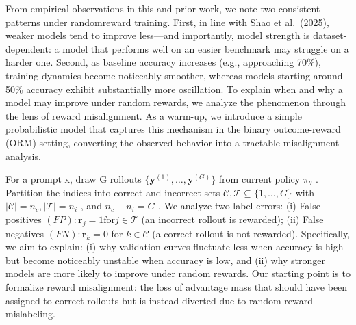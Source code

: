 \documentclass[
  10
]{article}
\begin{document}
From empirical observations in this and prior work, we note two
consistent patterns under randomreward training. First, in line with
Shao et al.~(2025), weaker models tend to improve less---and
importantly, model strength is dataset-dependent: a model that performs
well on an easier benchmark may struggle on a harder one. Second, as
baseline accuracy increases (e.g., approaching 70\%), training dynamics
become noticeably smoother, whereas models starting around 50\% accuracy
exhibit substantially more oscillation. To explain when and why a model
may improve under random rewards, we analyze the phenomenon through the
lens of reward misalignment. As a warm-up, we introduce a simple
probabilistic model that captures this mechanism in the binary
outcome-reward (ORM) setting, converting the observed behavior into a
tractable misalignment analysis.

For a prompt x, draw G rollouts
\(\{ \mathbf { y } ^ { ( 1 ) } , \ldots , \mathbf { y } ^ { ( G ) } \}\)
from current policy \(\pi _ { \theta }\) . Partition the indices into
correct and incorrect sets
\({ \mathcal { C } } , { \mathcal { T } } \subseteq \{ 1 , \ldots , G \}\)
with
\(| { \mathcal { C } } | = n _ { c } , | { \mathcal { T } } | = n _ { i }\)
, and \(n _ { c } + n _ { i } = G\) . We analyze two label errors: (i)
False positives
\(( F P ) \colon \mathbf { r } _ { j } = 1 \mathrm { f o r } j \in \mathcal { T }\)
(an incorrect rollout is rewarded); (ii) False negatives
\(( F N ) \colon \mathbf { r } _ { k } = 0\) for
\(k \in { \mathcal { C } }\) (a correct rollout is not rewarded).
Specifically, we aim to explain: (i) why validation curves fluctuate
less when accuracy is high but become noticeably unstable when accuracy
is low, and (ii) why stronger models are more likely to improve under
random rewards. Our starting point is to formalize reward misalignment:
the loss of advantage mass that should have been assigned to correct
rollouts but is instead diverted due to random reward mislabeling.
\end{document}
